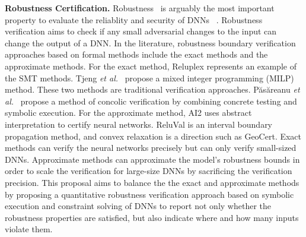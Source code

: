{\textbf{Robustness Certification.}} Robustness~\cite{carlini2017towards} is arguably the most important property to evaluate the reliablity and security of DNNs  ~\cite{NIPS2018shiqi}.
Robustness verification aims to check if any small adversarial  changes to the input can change the output of a DNN. 
In the literature, robustness boundary verification approaches based on formal methods include the exact methods and the approximate methods. 
For the exact method, Reluplex\cite{katz2017reluplex} represents an example of the SMT methods. Tjeng \textit{et al.}~\cite{tjeng2017evaluating} propose a mixed integer programming (MILP) method. These two methods are traditional verification approaches. P{\u{a}}s{\u{a}}reanu \textit{et al.}~\cite{puasuareanu2020probabilistic} propose a method of concolic verification by combining  concrete testing and symbolic execution.
For the approximate method, AI2 \cite{AI2} uses abstract interpretation to certify neural networks. ReluVal\cite{ReluVal} is an interval boundary propagation method, and convex relaxation is a direction such as GeoCert\cite{NEURIPS2019_GeoCert}. 
Exact methods can verify the neural networks precisely but can only verify small-sized DNNs. Approximate methods can approximate the model’s robustness bounds in order to scale the verification for large-size DNNs by sacrificing the verification precision. 
This proposal aims to balance the the exact and approximate methods by proposing a quantitative robustness verification approach based on symbolic execution and constraint solving of DNNs to report not only whether the robustness properties are satisfied, but also indicate where and how many inputs violate them.









